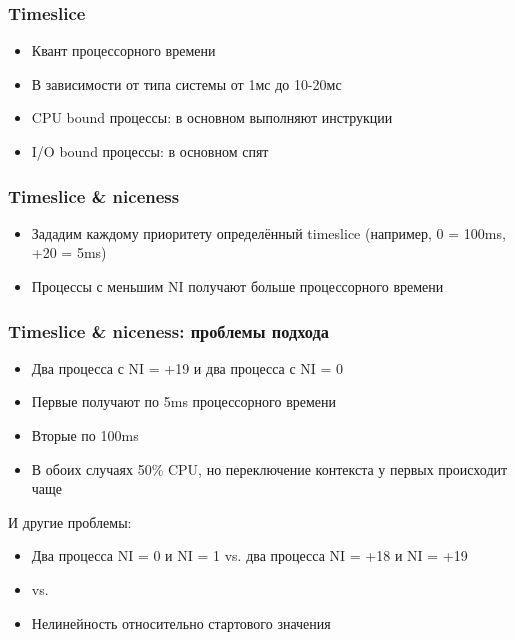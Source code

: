   \subsubsection{Timeslice}
    \begin{itemize}
      \item Квант процессорного времени
      \item В зависимости от типа системы от 1мс до 10-20мс
      \item CPU bound процессы: в основном выполняют инструкции
      \item I/O bound процессы: в основном спят
    \end{itemize}
  
  \subsubsection{Timeslice \& niceness}
    \begin{itemize}
      \item Зададим каждому приоритету определённый timeslice (например, 0 = 100ms, +20 = 5ms)
      \item Процессы с меньшим NI получают больше процессорного времени
    \end{itemize}
  
  \subsubsection{Timeslice \& niceness: проблемы подхода}
    \begin{itemize}
      \item Два процесса с NI = +19 и два процесса с NI = 0
      \item Первые получают по 5ms процессорного времени
      \item Вторые по 100ms
      \item В обоих случаях 50\% CPU, но переключение контекста у первых происходит чаще
    \end{itemize}
  
    И другие проблемы:
    \begin{itemize}
      \item Два процесса NI = 0 и NI = 1 vs. два процесса NI = +18 и NI = +19
      \item {} vs. 
      \item Нелинейность относительно стартового значения
    \end{itemize}
  
